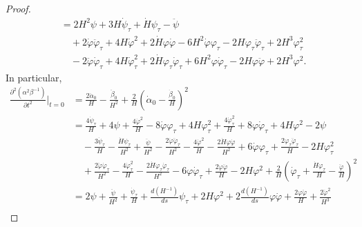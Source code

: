 \documentclass[11pt]{amsart}
\theoremstyle{definition}
\theoremstyle{remark}
\numberwithin{equation}{section}
\begin{document}
\begin{proof}
\begin{align*}
	&=2H^2\psi+3H\dot\psi_\tau+\dot H\psi_\tau-\ddot\psi\\
	&\quad+2\dot\varphi\ddot\varphi_\tau+4H\dot\varphi^2+2\dot H\varphi\dot\varphi-6H^2\dot\varphi\varphi_\tau-2H\varphi_\tau\ddot\varphi_\tau+2H^3\varphi_\tau^2\\
	&\quad-2\ddot\varphi\dot\varphi_\tau+4H\dot\varphi_\tau^2+2\dot H\varphi_\tau\dot\varphi_\tau+6H^2\varphi\dot\varphi_\tau-2H\varphi\ddot\varphi+2H^3\varphi^2.
\end{align*}
In particular,
\begin{equation}\label{eq:sec5}       
	\begin{split}
		\frac{\partial^2\left(\alpha^2\beta^{-1}\right)}{\partial t^2}\Big|_{t=0}&=\frac{2\ddot\alpha_0}{H}-\frac{\ddot\beta_0}{H^2}+\frac{2}{H}\left(\dot\alpha_0-\frac{\dot\beta_0}{H}\right)^2\\
		&=\frac{4\dot\psi_\tau}{H}+4\psi+\frac{4\dot\varphi^2}{H}-8\dot\varphi\varphi_\tau+4H\varphi_\tau^2+\frac{4\dot\varphi_\tau^2}{H}+8\varphi\dot\varphi_\tau+4H\varphi^2-2\psi\\
		&\quad -\frac{3\dot\psi_\tau}{H}-\frac{\dot H\psi_\tau}{H^2}+\frac{\ddot\psi}{H^2}-\frac{2\dot\varphi\ddot\varphi_\tau}{H^2}-\frac{4\dot\varphi^2}{H}-\frac{2\dot H\varphi\dot\varphi}{H^2}+6\dot\varphi\varphi_\tau+\frac{2\varphi_\tau\ddot\varphi_\tau}{H}-2H\varphi_\tau^2\\
		&\quad+\frac{2\ddot\varphi\dot\varphi_\tau}{H^2}-\frac{4\dot\varphi_\tau^2}{H}-\frac{2\dot H\varphi_\tau\dot\varphi_\tau}{H^2}-6\varphi\dot\varphi_\tau+\frac{2\varphi\ddot\varphi}{H}-2H\varphi^2+\frac{2}{H}\left(\dot\varphi_\tau+\frac{\dot H\varphi_\tau}{H}-\frac{\ddot\varphi}{H}\right)^2\\
		&=2\psi+\frac{\ddot\psi}{H^2}+\frac{\dot\psi_\tau}{H}+\frac{d(H^{-1})}{ds}\psi_\tau+2H\varphi^2+2\frac{d(H^{-1})}{ds}\varphi\dot\varphi+\frac{2\varphi\ddot\varphi}{H}+\frac{2\ddot\varphi^2}{H^3}\\

\end{split}
\end{equation}
\end{proof}
\end{document}
